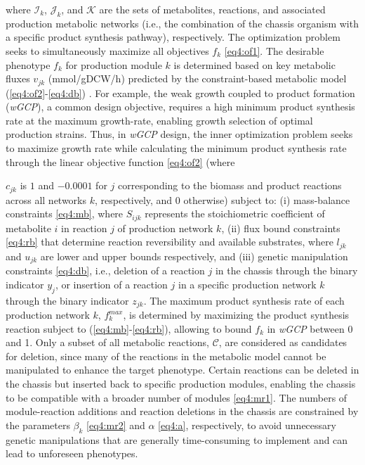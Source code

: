 \noindent where $\mathcal{I}_k$, $\mathcal{J}_k$, and $\mathcal{K}$ are the sets of metabolites, reactions, and associated production metabolic networks (i.e., the combination of the chassis organism with a specific product synthesis pathway), respectively.
The optimization problem seeks to simultaneously maximize all objectives $f_k$ \eqref{eq4:of1}.
The desirable phenotype $f_k$ for production module $k$ is determined based on key metabolic fluxes $v_{jk}$ (mmol/gDCW/h) predicted by the constraint-based metabolic model (\ref{eq4:of2}-\ref{eq4:db}) \cite{palsson2015}.
For example, the weak growth coupled to product formation (\emph{wGCP}), a common design objective, requires a high minimum product synthesis rate at the maximum growth-rate, enabling growth selection of optimal production strains. Thus, in \emph{wGCP} design, the inner optimization problem seeks to maximize growth rate while calculating the minimum product synthesis rate through the linear objective function \eqref{eq4:of2} (where {$c_{jk}$ is $1$ and $-0.0001$ for $j$ corresponding to the biomass and product reactions across all networks $k$, respectively, and 0 otherwise)
subject to: (i) mass-balance constraints \eqref{eq4:mb}, where $S_{ijk}$ represents the stoichiometric coefficient of metabolite $i$ in reaction $j$ of production network $k$, (ii) flux bound constraints \eqref{eq4:rb} that determine reaction reversibility and available substrates, where $l_{jk}$ and $u_{jk}$ are lower and upper bounds respectively, and (iii) genetic manipulation constraints \eqref{eq4:db}, i.e., deletion of a reaction $j$ in the chassis through the binary indicator $y_{j}$, or insertion of a reaction $j$ in a specific production network $k$ through the binary indicator $z_{jk}$.
The maximum product synthesis rate of each production network $k$, $f_k^{max}$, is determined by maximizing the product synthesis reaction subject to (\ref{eq4:mb}-\ref{eq4:rb}), allowing to bound $f_k$ in \textit{wGCP} between 0 and 1.
Only a subset of all metabolic reactions, $\mathcal{C}$, are considered as candidates for deletion, since many of the reactions in the metabolic model cannot be manipulated to enhance the target phenotype.
Certain reactions can be deleted in the chassis but inserted back to specific production modules, enabling the chassis to be compatible with a broader number of modules \eqref{eq4:mr1}.
The numbers of module-reaction additions and reaction deletions in the chassis are constrained by the parameters $\beta_k$ \eqref{eq4:mr2} and $\alpha$ \eqref{eq4:a}, respectively, to avoid unnecessary genetic manipulations that are generally time-consuming to implement and can lead to unforeseen phenotypes.

}
